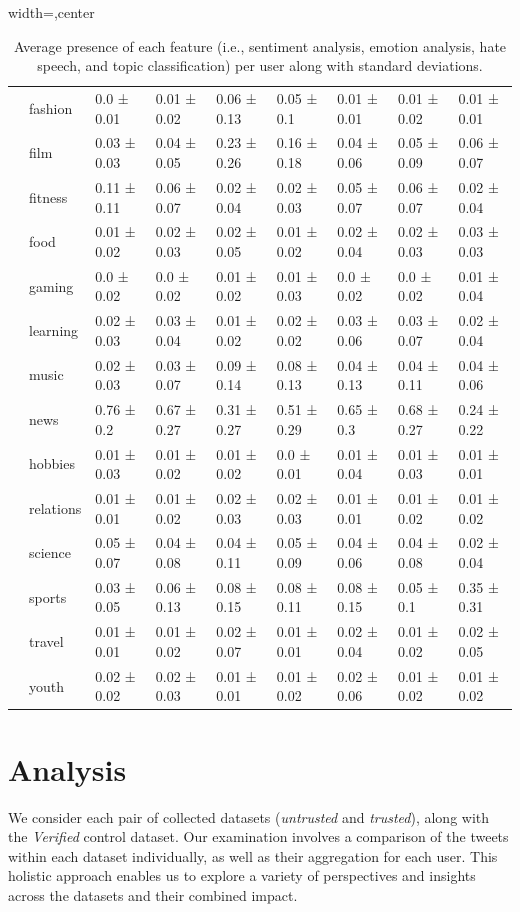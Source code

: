 \begin{table}
\begin{adjustbox}{width=\textwidth,center}
\begin{tabular}{llll|ll|ll|l}
 & fashion & 0.0 ± 0.01 & 0.01 ± 0.02 & 0.06 ± 0.13 & 0.05 ± 0.1 & 0.01 ± 0.01 & 0.01 ± 0.02 & 0.01 ± 0.01 \\
 & film & 0.03 ± 0.03 & 0.04 ± 0.05 & 0.23 ± 0.26 & 0.16 ± 0.18 & 0.04 ± 0.06 & 0.05 ± 0.09 & 0.06 ± 0.07 \\
 & fitness & 0.11 ± 0.11 & 0.06 ± 0.07 & 0.02 ± 0.04 & 0.02 ± 0.03 & 0.05 ± 0.07 & 0.06 ± 0.07 & 0.02 ± 0.04 \\
 & food & 0.01 ± 0.02 & 0.02 ± 0.03 & 0.02 ± 0.05 & 0.01 ± 0.02 & 0.02 ± 0.04 & 0.02 ± 0.03 & 0.03 ± 0.03 \\
 & gaming & 0.0 ± 0.02 & 0.0 ± 0.02 & 0.01 ± 0.02 & 0.01 ± 0.03 & 0.0 ± 0.02 & 0.0 ± 0.02 & 0.01 ± 0.04 \\
 & learning & 0.02 ± 0.03 & 0.03 ± 0.04 & 0.01 ± 0.02 & 0.02 ± 0.02 & 0.03 ± 0.06 & 0.03 ± 0.07 & 0.02 ± 0.04 \\
 & music & 0.02 ± 0.03 & 0.03 ± 0.07 & 0.09 ± 0.14 & 0.08 ± 0.13 & 0.04 ± 0.13 & 0.04 ± 0.11 & 0.04 ± 0.06 \\
 & news & 0.76 ± 0.2 & 0.67 ± 0.27 & 0.31 ± 0.27 & 0.51 ± 0.29 & 0.65 ± 0.3 & 0.68 ± 0.27 & 0.24 ± 0.22 \\
 & hobbies & 0.01 ± 0.03 & 0.01 ± 0.02 & 0.01 ± 0.02 & 0.0 ± 0.01 & 0.01 ± 0.04 & 0.01 ± 0.03 & 0.01 ± 0.01 \\
 & relations & 0.01 ± 0.01 & 0.01 ± 0.02 & 0.02 ± 0.03 & 0.02 ± 0.03 & 0.01 ± 0.01 & 0.01 ± 0.02 & 0.01 ± 0.02 \\
 & science & 0.05 ± 0.07 & 0.04 ± 0.08 & 0.04 ± 0.11 & 0.05 ± 0.09 & 0.04 ± 0.06 & 0.04 ± 0.08 & 0.02 ± 0.04 \\
 & sports & 0.03 ± 0.05 & 0.06 ± 0.13 & 0.08 ± 0.15 & 0.08 ± 0.11 & 0.08 ± 0.15 & 0.05 ± 0.1 & 0.35 ± 0.31 \\
 & travel & 0.01 ± 0.01 & 0.01 ± 0.02 & 0.02 ± 0.07 & 0.01 ± 0.01 & 0.02 ± 0.04 & 0.01 ± 0.02 & 0.02 ± 0.05 \\
 & youth & 0.02 ± 0.02 & 0.02 ± 0.03 & 0.01 ± 0.01 & 0.01 ± 0.02 & 0.02 ± 0.06 & 0.01 ± 0.02 & 0.01 ± 0.02
\end{tabular}
\end{adjustbox}
\caption{Average presence of each feature (i.e., sentiment analysis, emotion analysis, hate speech, and topic classification) per user along with standard deviations.}
\label{tab:results}
\end{table}

\section{Analysis}
We consider each pair of collected datasets (\textit{untrusted} and \textit{trusted}), along with the \textit{Verified} control dataset. Our examination involves a comparison of the tweets within each dataset individually, as well as their aggregation for each user. This holistic approach enables us to explore a variety of perspectives and insights across the datasets and their combined impact.

